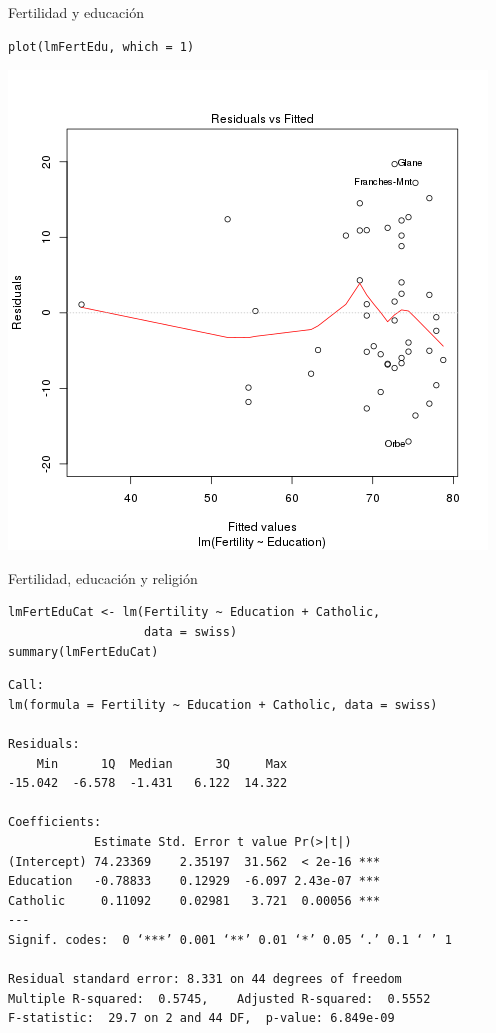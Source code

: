 \documentclass[xcolor={usenames,svgnames,dvipsnames}]{beamer}
\begin{document}
\begin{frame}[fragile,label=sec-5-4]{Fertilidad y educación}
 \lstset{language=R,label= ,caption= ,numbers=none}
\begin{lstlisting}
plot(lmFertEdu, which = 1)
\end{lstlisting}

\includegraphics[height=0.85\textheight]{figs/lmFertEdu.png}
\end{frame}



\begin{frame}[fragile,label=sec-5-5]{Fertilidad, educación y religión}
 \lstset{language=R,label= ,caption= ,numbers=none}
\begin{lstlisting}
lmFertEduCat <- lm(Fertility ~ Education + Catholic,
                   data = swiss)
summary(lmFertEduCat)
\end{lstlisting}

\begin{verbatim}
Call:
lm(formula = Fertility ~ Education + Catholic, data = swiss)

Residuals:
    Min      1Q  Median      3Q     Max 
-15.042  -6.578  -1.431   6.122  14.322 

Coefficients:
            Estimate Std. Error t value Pr(>|t|)    
(Intercept) 74.23369    2.35197  31.562  < 2e-16 ***
Education   -0.78833    0.12929  -6.097 2.43e-07 ***
Catholic     0.11092    0.02981   3.721  0.00056 ***
---
Signif. codes:  0 ‘***’ 0.001 ‘**’ 0.01 ‘*’ 0.05 ‘.’ 0.1 ‘ ’ 1

Residual standard error: 8.331 on 44 degrees of freedom
Multiple R-squared:  0.5745,	Adjusted R-squared:  0.5552 
F-statistic:  29.7 on 2 and 44 DF,  p-value: 6.849e-09
\end{verbatim}
\end{frame}
\end{document}
